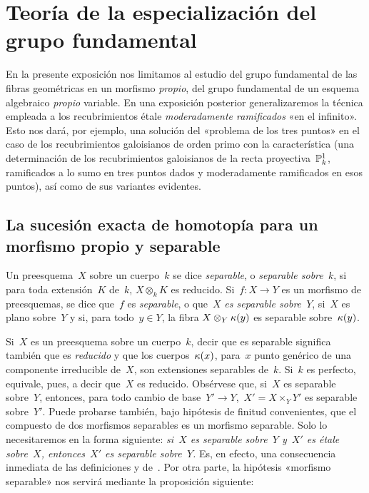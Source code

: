 \chapter{Teoría de la especialización del grupo fundamental}
\label{X}
En la presente exposición nos limitamos al estudio del grupo fundamental de
las fibras geométricas en un morfismo \emph{propio}, \ie del grupo fundamental
de un esquema algebraico \emph{propio} variable. En una exposición posterior
generalizaremos la técnica empleada a los recubrimientos étale
\emph{moderadamente ramificados} «en el infinito». Esto nos dará, por ejemplo,
una solución del «problema de los tres puntos» en el caso de los recubrimientos
galoisianos de orden primo con la característica (\ie una determinación de los
recubrimientos galoisianos de la recta proyectiva~$\mathbb P_k^1$, ramificados a lo
sumo en tres puntos dados y moderadamente ramificados en esos puntos), así como
de sus variantes evidentes.

\section[La sucesión exacta de homotopía para un morfismo propio]
{La sucesión exacta de homotopía para un morfismo propio y separable}
\label{X.1}

\begin{definition}
\label{X.1.1}
Un preesquema~$X$ sobre un cuerpo~$k$ se dice \emph{separable}, o
\emph{separable sobre~$k$}, si para toda extensión~$K$ de~$k$,
$X\otimes_k K$ es reducido. Si~$f\colon X\to Y$ es un morfismo de
preesquemas, se dice que~$f$ es \emph{separable}, o que~$X$ \emph{es separable
sobre~$Y$}, si~$X$ es plano sobre~$Y$ y si, para todo~$y\in Y$, la fibra
$X\otimes_Y \kappa(y)$ es separable sobre~$\kappa(y)$.
\end{definition}

Si~$X$ es un preesquema sobre un cuerpo~$k$, decir que es separable significa
también que es \emph{reducido} y que los cuerpos~$\kappa(x)$, para~$x$ punto
genérico de una componente irreducible de~$X$, son extensiones separables
de~$k$. Si~$k$ es perfecto, equivale, pues, a decir que~$X$ es reducido.
Obsérvese que, si~$X$ es separable sobre~$Y$, entonces, para todo cambio de
base~$Y'\to Y$,~$X'=X\times_Y Y'$ es separable sobre~$Y'$. Puede probarse
también, bajo hipótesis de finitud convenientes, que el compuesto de dos
morfismos separables es
un morfismo separable. Solo lo necesitaremos en la forma siguiente:
\emph{si~$X$ es separable sobre~$Y$ y~$X'$ es étale sobre~$X$, entonces~$X'$
es separable sobre~$Y$.} Es, en efecto, una consecuencia inmediata de las
definiciones y de~. Por otra parte, la hipótesis «morfismo
separable» nos servirá mediante la proposición siguiente:

